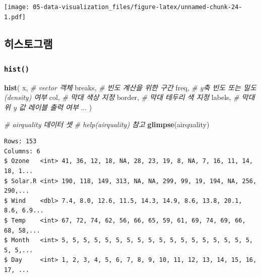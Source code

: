 \documentclass[
  11pt,
]{krantz}
\newenvironment{Shaded}{\begin{snugshade}}{\end{snugshade}}
\newcommand{\CommentTok}[1]{\textcolor[rgb]{0.37,0.37,0.37}{\textit{#1}}}
\newcommand{\KeywordTok}[1]{\textcolor[rgb]{0.27,0.27,0.27}{\textbf{#1}}}
\newcommand{\NormalTok}[1]{#1}
\begin{document}
\texttt{[image: 05-data-visualization\_files/figure-latex/unnamed-chunk-24-1.pdf]}

\normalsize

\hypertarget{histogram}{%
\subsection{히스토그램}\label{histogram}}

\hypertarget{hist}{%
\subsubsection*{\texorpdfstring{\textbf{\texttt{hist()}}}{hist()}}\label{hist}}


\footnotesize

\begin{Shaded}
\begin{Highlighting}[]
\KeywordTok{hist}\NormalTok{(}
\NormalTok{  x, }\CommentTok{# vector 객체}
\NormalTok{  breaks, }\CommentTok{# 빈도 계산을 위한 구간}
\NormalTok{  freq, }\CommentTok{# y축 빈도 또는 밀도(density) 여부}
\NormalTok{  col, }\CommentTok{# 막대 색상 지정}
\NormalTok{  border, }\CommentTok{# 막대 테두리 색 지정}
\NormalTok{  labels, }\CommentTok{# 막대 위 y 값 레이블 출력 여부 }
\NormalTok{  ...}
\NormalTok{)}
\end{Highlighting}
\end{Shaded}

\normalsize

\footnotesize

\begin{Shaded}
\begin{Highlighting}[]
\CommentTok{# airquality 데이터 셋}
\CommentTok{# help(airquality) 참고}
\KeywordTok{glimpse}\NormalTok{(airquality)}
\end{Highlighting}
\end{Shaded}

\begin{verbatim}
Rows: 153
Columns: 6
$ Ozone   <int> 41, 36, 12, 18, NA, 28, 23, 19, 8, NA, 7, 16, 11, 14, 18, 1...
$ Solar.R <int> 190, 118, 149, 313, NA, NA, 299, 99, 19, 194, NA, 256, 290,...
$ Wind    <dbl> 7.4, 8.0, 12.6, 11.5, 14.3, 14.9, 8.6, 13.8, 20.1, 8.6, 6.9...
$ Temp    <int> 67, 72, 74, 62, 56, 66, 65, 59, 61, 69, 74, 69, 66, 68, 58,...
$ Month   <int> 5, 5, 5, 5, 5, 5, 5, 5, 5, 5, 5, 5, 5, 5, 5, 5, 5, 5, 5, 5,...
$ Day     <int> 1, 2, 3, 4, 5, 6, 7, 8, 9, 10, 11, 12, 13, 14, 15, 16, 17, ...
\end{verbatim}
\end{document}
